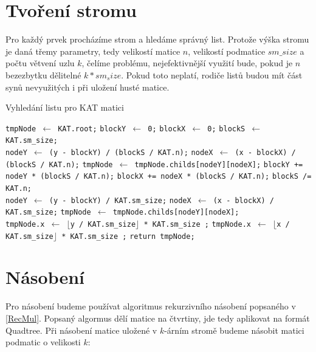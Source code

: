 \section{Tvoření stromu}

Pro každý prvek procházíme strom a hledáme správný list. Protože výška stromu je daná třemy parametry, tedy velikostí matice $n$, velikostí podmatice $sm\_size$ a počtu větvení uzlu $k$, čelíme problému, nejefektivnější využití bude, pokud je $n$ bezezbytku dělitelné $k * sm_size$. Pokud toto neplatí, rodiče listů budou mít část synů nevyužitých i při uložení husté matice.

\label{alg:kat-create}
\begin{algorithm}[H]
	\caption{Vyhledání listu pro KAT matici}\label{kat-create}
	\begin{algorithmic}[1]
		\State \texttt{tmpNode $\gets$ KAT.root;}
		\State \texttt{blockY $\gets$ 0;}
		\State \texttt{blockX $\gets$ 0;}
		\State \texttt{blockS $\gets$ KAT.sm\_size;}
		\\
			\State \texttt{nodeY $\gets$ (y - blockY) / (blockS / KAT.n);}
			\State \texttt{nodeX $\gets$ (x - blockX) / (blockS / KAT.n);}
			\State \texttt{tmpNode $\gets$ tmpNode.childs[nodeY][nodeX];}
			\State \texttt{blockY += nodeY * (blockS / KAT.n);}
			\State \texttt{blockX += nodeX * (blockS / KAT.n);}
			\State \texttt{blockS /= KAT.n;}
		\EndWhile
		\\
		\State \texttt{nodeY $\gets$ (y - blockY) / KAT.sm\_size;}
		\State \texttt{nodeX $\gets$ (x - blockX) / KAT.sm\_size;}
		\State \texttt{tmpNode $\gets$ tmpNode.childs[nodeY][nodeX];} 	
		\\
		\State \texttt{tmpNode.x $\gets$ $\lfloor$y / KAT.sm\_size$\rfloor$ * KAT.sm\_size ;}
		\State \texttt{tmpNode.x $\gets$ $\lfloor$x / KAT.sm\_size$\rfloor$ * KAT.sm\_size ;}
		\State \texttt{return tmpNode;}
		\EndProcedure
	\end{algorithmic}
\end{algorithm}

\section{Násobení}

Pro násobení budeme používat algoritmus rekurzivního násobení popsaného v \ref{RecMul}. Popsaný algormus dělí matice na čtvrtiny, jde tedy aplikovat na formát Quadtree. Při násobení matice uložené v $k$-árním stromě budeme násobit matici podmatic o velikosti $k$:

